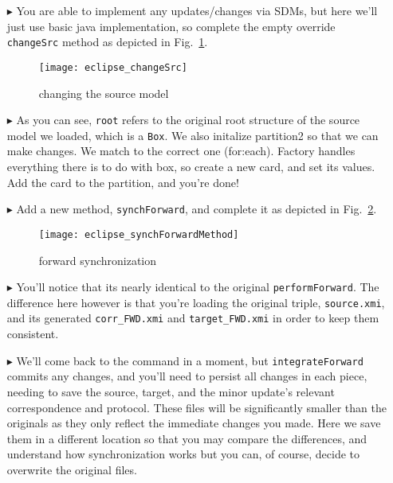 \begin{itemize}

\item[$\blacktriangleright$] You are able to implement any updates/changes via SDMs, but here we'll just use basic java implementation, so complete the empty
override \texttt{changeSrc} method as depicted in Fig.~\ref{eclipse:changeSrc}.

\begin{figure}[htbp]
\begin{center}
  \texttt{[image: eclipse\_changeSrc]}
  \caption{changing the source model}
  \label{eclipse:changeSrc}
\end{center}
\end{figure}

\item[$\blacktriangleright$] As you can see, \texttt{root} refers to the original root structure of the source model we loaded, which is a \texttt{Box}. We also
initalize partition2 so that we can make changes. We match to the correct one (for:each). Factory handles everything there is to do with box, so create a new
card, and set its values. Add the card to the partition, and you're done!

\item[$\blacktriangleright$] Add a new method, \texttt{synchForward}, and complete it as depicted in Fig.~\ref{eclipse:SynchForwardMethod}. 

\begin{figure}[htbp]
\begin{center}
  \texttt{[image: eclipse\_synchForwardMethod]}
  \caption{forward synchronization}
  \label{eclipse:SynchForwardMethod}
\end{center}
\end{figure}

\item[$\blacktriangleright$] You'll notice that its nearly identical to the original \texttt{performForward}. The difference here however is that you're loading
the original triple, \texttt{source.xmi}, and its generated \texttt{corr\_FWD.xmi} and \texttt{target\_FWD.xmi} in order to keep them consistent.

\item[$\blacktriangleright$] We'll come back to the command in a moment, but \texttt{integrateForward} commits any changes, and you'll need to persist all
changes in each piece, needing to save the source, target, and the minor update's relevant correspondence and protocol. These files will be significantly
smaller than the originals as they only reflect the immediate changes you made. Here we save them in a different location so that you may compare the
differences, and understand how synchronization works but you can, of course, decide to overwrite the original files. 



\end{itemize}
